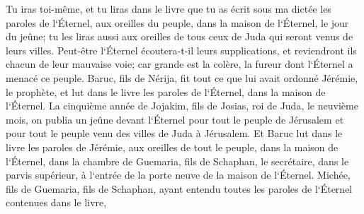 \verse Tu iras toi-même, et tu liras dans le livre que tu as écrit sous ma dictée les paroles de l`Éternel, aux oreilles du peuple, dans la maison de l`Éternel, le jour du jeûne; tu les liras aussi aux oreilles de tous ceux de Juda qui seront venus de leurs villes. 
\verse Peut-être l`Éternel écoutera-t-il leurs supplications, et reviendront ils chacun de leur mauvaise voie; car grande est la colère, la fureur dont l`Éternel a menacé ce peuple. 
\verse Baruc, fils de Nérija, fit tout ce que lui avait ordonné Jérémie, le prophète, et lut dans le livre les paroles de l`Éternel, dans la maison de l`Éternel. 
\verse La cinquième année de Jojakim, fils de Josias, roi de Juda, le neuvième mois, on publia un jeûne devant l`Éternel pour tout le peuple de Jérusalem et pour tout le peuple venu des villes de Juda à Jérusalem. 
\verse Et Baruc lut dans le livre les paroles de Jérémie, aux oreilles de tout le peuple, dans la maison de l`Éternel, dans la chambre de Guemaria, fils de Schaphan, le secrétaire, dans le parvis supérieur, à l`entrée de la porte neuve de la maison de l`Éternel. 
\verse Michée, fils de Guemaria, fils de Schaphan, ayant entendu toutes les paroles de l`Éternel contenues dans le livre, 
